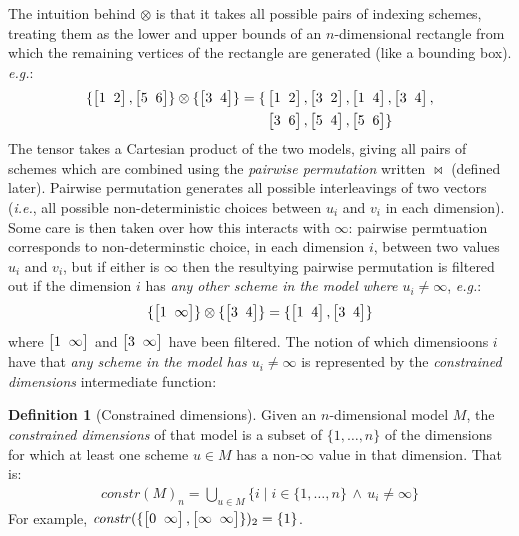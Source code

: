 \documentclass[9pt]{sigplanconf}
\newcounter{block}
\theoremstyle{definition}
\newtheorem{definition}[block]{Definition}
\newcommand{\ie}{\emph{i.e.}}
\newcommand{\eg}{\emph{e.g.}}
\newcommand{\vtwoh}[2]{\setlength{\arraycolsep}{0em}
\left[\begin{array}{cc}#1 \; & \; #2\end{array}\right]}
\newcommand{\effdims}[2]{\mathit{constr}(#1)_{#2}}
\begin{document}
The intuition behind $\otimes$ is that it takes
all possible pairs of indexing schemes, treating them as the
lower and upper bounds of an $n$-dimensional rectangle from which the 
remaining vertices of the rectangle are generated (like a bounding
box). \eg{}:
\begin{align*}
\{\vtwoh{1}{2}, \vtwoh{5}{6}\} \otimes \{\vtwoh{3}{4}\} = 
\{&\vtwoh{1}{2}, \vtwoh{3}{2}, \vtwoh{1}{4}, \vtwoh{3}{4}, \\
  & \vtwoh{3}{6}, \vtwoh{5}{4}, \vtwoh{5}{6}\}
\end{align*}
The tensor takes a Cartesian product of the two models,
giving all pairs of schemes which are combined using the 
\emph{pairwise permutation} written $\bowtie$ (defined later).
Pairwise permutation generates all possible interleavings of two vectors
(\ie{}, all possible non-deterministic choices between $u_i$ and
$v_i$ in each dimension). Some care is then taken over
how this interacts with $\infty$: pairwise permtuation
corresponds to non-determinstic choice, in each dimension $i$,
between two values $u_i$ and $v_i$, but if either 
is $\infty$ then the resultying pairwise permutation is 
filtered out if the dimension $i$ has \emph{any other scheme
in the model where $u_i \neq \infty$}, \eg{}:
\begin{align*}
\{\vtwoh{1}{\infty}\} \otimes \{\vtwoh{3}{4}\} = 
\{\vtwoh{1}{4}, \vtwoh{3}{4}\}
\end{align*}
% 
where $\vtwoh{1}{\infty}$ and $\vtwoh{3}{\infty}$ have been filtered.
%
%
%
The notion of which dimensioons $i$ have that \emph{any scheme in the model
has $u_i \neq \infty$} is represented by the \emph{constrained
dimensions} intermediate function:
%
\begin{definition}[Constrained dimensions]
Given an $n$-dimensional model $M$, the \emph{constrained dimensions}
of that model is a subset of $\{1, \ldots, n\}$ of 
the dimensions for which at least one scheme $u \in M$ has
a non-$\infty$ value in that dimension. That is:
%
\begin{align*}
\effdims{M}{n} =
\bigcup_{u \in M} \{i \mid i \in \{1,\ldots,n\} \, \wedge \, u_i \neq
  \infty\}
\end{align*}
For example, $\effdims{\{\vtwoh{0}{\infty},\vtwoh{\infty}{\infty}\}}{2}
 = \{1\}$.
\end{definition}
\end{document}
